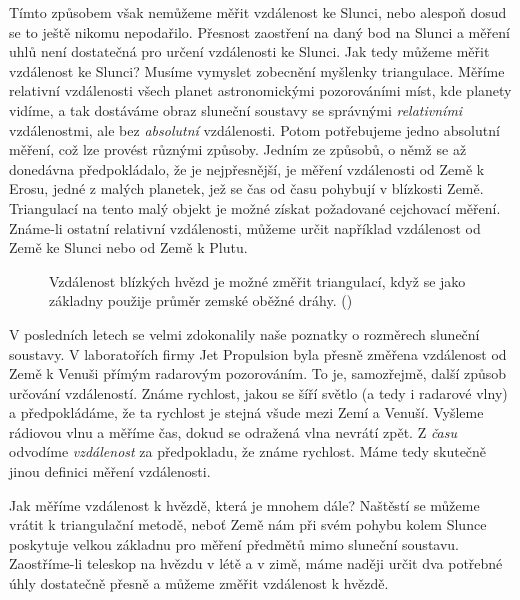     Tímto způsobem však nemůžeme měřit vzdálenost ke Slunci, nebo alespoň dosud se to ještě nikomu 
    nepodařilo. Přesnost zaostření na daný bod na Slunci a měření uhlů není dostatečná pro určení 
    vzdálenosti ke Slunci. Jak tedy můžeme měřit vzdálenost ke Slunci? Musíme vymyslet zobecnění 
    myšlenky triangulace. Měříme relativní vzdálenosti všech planet astronomickými pozorováními 
    míst, kde planety vidíme, a tak dostáváme obraz sluneční soustavy se správnými 
    \emph{relativními} vzdálenostmi, ale bez \emph{absolutní} vzdálenosti. Potom potřebujeme jedno 
    absolutní měření, což lze provést různými způsoby. Jedním ze způsobů, o němž se až donedávna 
    předpokládalo, že je nejpřesnější, je měření vzdálenosti od Země k Erosu, jedné z malých 
    planetek, jež se čas od času pohybují v blízkosti Země. Triangulací na tento malý objekt je 
    možné získat požadované cejchovací měření. Známe-li ostatní relativní vzdálenosti, můžeme určit 
    například vzdálenost od Země ke Slunci nebo od Země k Plutu.
    
    \begin{figure}[ht!]  %
      \centering
      \caption{Vzdálenost blízkých hvězd je možné změřit triangulací, když se jako základny použije 
               průměr zemské oběžné dráhy. (\cite[s.~71]{Feynman01})}
      \label{fyz:fig0069}
    \end{figure}     
    V posledních letech se velmi zdokonalily naše poznatky o rozměrech sluneční soustavy. V 
    laboratořích firmy Jet Propulsion byla přesně změřena vzdálenost od Země k Venuši přímým 
    radarovým pozorováním. To je, samozřejmě, další způsob určování vzdáleností. Známe rychlost, 
    jakou se šíří světlo (a tedy i radarové vlny) a předpokládáme, že ta rychlost je stejná všude 
    mezi Zemí a Venuší. Vyšleme rádiovou vlnu a měříme čas, dokud se odražená vlna nevrátí zpět. Z 
    \emph{času} odvodíme \emph{vzdálenost} za předpokladu, že známe rychlost. Máme tedy skutečně 
    jinou definici měření vzdálenosti.
    
    Jak měříme vzdálenost k hvězdě, která je mnohem dále? Naštěstí se můžeme vrátit k triangulační 
    metodě, neboť Země nám při svém pohybu kolem Slunce poskytuje velkou základnu pro měření 
    předmětů mimo sluneční soustavu. Zaostříme-li teleskop na hvězdu v létě a v zimě, máme naději 
    určit dva potřebné úhly dostatečně přesně a můžeme změřit vzdálenost k hvězdě.
   
